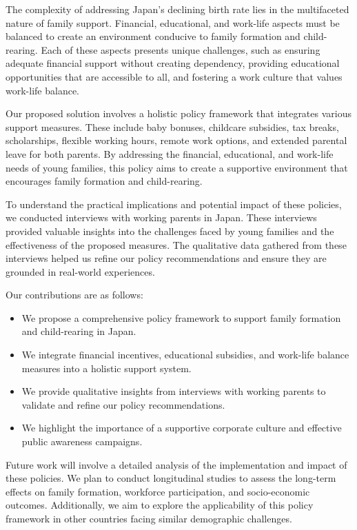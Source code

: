\documentclass{article} %
\begin{document}
The complexity of addressing Japan's declining birth rate lies in the multifaceted nature of family support. Financial, educational, and work-life aspects must be balanced to create an environment conducive to family formation and child-rearing. Each of these aspects presents unique challenges, such as ensuring adequate financial support without creating dependency, providing educational opportunities that are accessible to all, and fostering a work culture that values work-life balance.

Our proposed solution involves a holistic policy framework that integrates various support measures. These include baby bonuses, childcare subsidies, tax breaks, scholarships, flexible working hours, remote work options, and extended parental leave for both parents. By addressing the financial, educational, and work-life needs of young families, this policy aims to create a supportive environment that encourages family formation and child-rearing.

To understand the practical implications and potential impact of these policies, we conducted interviews with working parents in Japan. These interviews provided valuable insights into the challenges faced by young families and the effectiveness of the proposed measures. The qualitative data gathered from these interviews helped us refine our policy recommendations and ensure they are grounded in real-world experiences.

Our contributions are as follows:
\begin{itemize}
    \item We propose a comprehensive policy framework to support family formation and child-rearing in Japan.
    \item We integrate financial incentives, educational subsidies, and work-life balance measures into a holistic support system.
    \item We provide qualitative insights from interviews with working parents to validate and refine our policy recommendations.
    \item We highlight the importance of a supportive corporate culture and effective public awareness campaigns.
\end{itemize}

Future work will involve a detailed analysis of the implementation and impact of these policies. We plan to conduct longitudinal studies to assess the long-term effects on family formation, workforce participation, and socio-economic outcomes. Additionally, we aim to explore the applicability of this policy framework in other countries facing similar demographic challenges.
\end{document}
